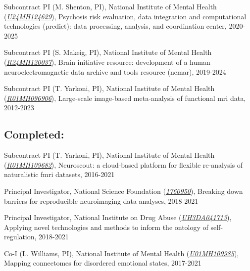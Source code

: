 \documentclass[10pt, letterpaper]{article}
\begin{document}
Subcontract PI (M. Shenton, PI), National Institute of Mental Health (\href{https://reporter.nih.gov/project-details/10092398}{\textit{U24MH124629}}), Psychosis risk evaluation, data integration and computational technologies (predict): data processing, analysis, and coordination center, 2020-2025\vspace{2mm}

Subcontract PI (S. Makeig, PI), National Institute of Mental Health (\href{http://projectreporter.nih.gov/project_info_description.cfm?aid=9795341}{\textit{R24MH120037}}), Brain initiative resource: development of a human neuroelectromagnetic data archive and tools resource (nemar), 2019-2024\vspace{2mm}

Subcontract PI (T. Yarkoni, PI), National Institute of Mental Health (\href{https://projectreporter.nih.gov/project_info_description.cfm?aid=9881347}{\textit{R01MH096906}}), Large-scale image-based meta-analysis of functional mri data, 2012-2023\vspace{2mm}

\subsection*{Completed:}Subcontract PI (T. Yarkoni, PI), National Institute of Mental Health  (\href{https://projectreporter.nih.gov/project_info_description.cfm?aid=9742532}{\textit{R01MH109682}}), Neuroscout: a cloud-based platform for flexible re-analysis of naturalistic fmri datasets, 2016-2021\vspace{2mm}

Principal Investigator, National Science Foundation  (\href{http://www.nsf.gov/awardsearch/showAward?AWD_ID=1760950&HistoricalAwards=false}{\textit{1760950}}), Breaking down barriers for reproducible neuroimaging data analyses, 2018-2021\vspace{2mm}

Principal Investigator, National Institute on Drug Abuse  (\href{http://projectreporter.nih.gov/project_info_description.cfm?aid=9780476}{\textit{UH3DA041713}}), Applying novel technologies and methods to inform the ontology of self-regulation, 2018-2021\vspace{2mm}

Co-I (L. Williams, PI), National Institute of Mental Health  (\href{https://projectreporter.nih.gov/project_info_description.cfm?aid=9925811}{\textit{U01MH109985}}), Mapping connectomes for disordered emotional states, 2017-2021\vspace{2mm}
\end{document}
